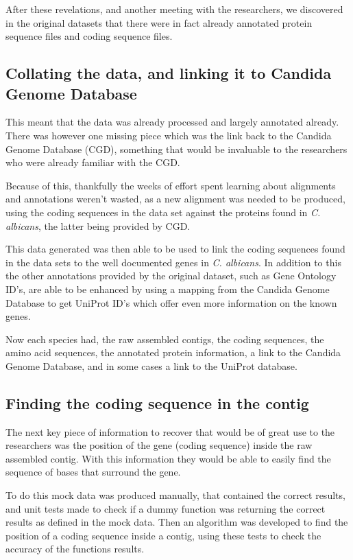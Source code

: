 After these revelations, and another meeting with the researchers, we discovered in the original datasets that there were in fact already annotated protein sequence files and coding sequence files.

\subsection{Collating the data, and linking it to Candida Genome Database}
This meant that the data was already processed and largely annotated already. There was however one missing piece which was the link back to the Candida Genome Database (CGD), something that would be invaluable to the researchers who were already familiar with the CGD. 

Because of this, thankfully the weeks of effort spent learning about alignments and annotations weren't wasted, as a new alignment was needed to be produced, using the coding sequences in the data set against the proteins found in \textit{C. albicans}, the latter being provided by CGD\cite{albicans}. 

This data generated was then able to be used to link the coding sequences found in the data sets to the well documented genes in \textit{C. albicans}. In addition to this the other annotations provided by the original dataset, such as Gene Ontology ID's, are able to be enhanced by using a mapping from the Candida Genome Database to get UniProt ID's which offer even more information on the known genes. 

Now each species had, the raw assembled contigs, the coding sequences, the amino acid sequences, the annotated protein information, a link to the Candida Genome Database, and in some cases a link to the UniProt database.


\subsection{Finding the coding sequence in the contig}
The next key piece of information to recover that would be of great use to the researchers was the position of the gene (coding sequence) inside the raw assembled contig. With this information they would be able to easily find the sequence of bases that surround the gene.

To do this mock data was produced manually, that contained the correct results, and unit tests made to check if a dummy function was returning the correct results as defined in the mock data. Then an algorithm was developed to find the position of a coding sequence inside a contig, using these tests to check the accuracy of the functions results.

